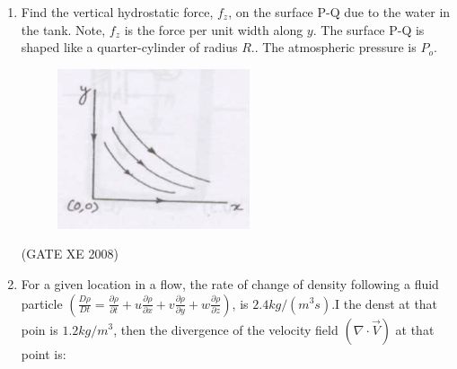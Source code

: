 \documentclass[12pt]{article}
\begin{document}
\begin{enumerate}
\begin{enumerate}
\end{enumerate}

(GATE XE 2008)
\item Find the vertical hydrostatic force, $f_{z}$, on the surface P-Q due to the water in the tank. Note, $f_{z}$ is the force per unit width along $y$. The surface P-Q is shaped like a quarter-cylinder of radius $R$.. The atmospheric pressure is $P_{o}$.

\begin{figure}[H]
\centering
  \includegraphics[width=0.5\columnwidth]{figs/ass1_d_q12.png}
  \caption{}
\end{figure} 

\begin{enumerate}
\end{enumerate}

(GATE XE 2008)
\item For a given location in a flow, the rate of change of density following a fluid particle
$(\frac{D\rho}{Dt} = \frac{\partial \rho}{\partial t} + u\frac{\partial \rho}{\partial x} + v\frac{\partial \rho}{\partial y} + w\frac{\partial \rho}{\partial z})$, is $2.4 kg/(m^3 s)$.I the denst at that poin is $1.2 kg/m^3$, then
the divergence of the velocity field $(\nabla \cdot \vec{V})$ at that point is:


\end{enumerate}
\end{document}
